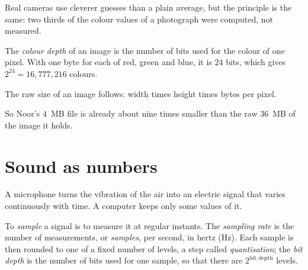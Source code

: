 \label{lst:g10:images-sound-compression:demosaic}

\label{out:g10:images-sound-compression:demosaic}

Real cameras use cleverer guesses than a plain average, but the principle is the same: two thirds of the colour
values of a photograph were computed, not measured.

\begin{definition}\label{def:g10:images-sound-compression:colour-depth}
The \emph{colour depth} of an image is the number of bits used for the colour of one pixel. With
one byte for each of red, green and blue, it is $24$ bits, which gives $2^{24} = 16{,}777{,}216$ colours.
\end{definition}

The raw size of an image follows: width times height times bytes per pixel.

\label{lst:g10:images-sound-compression:raw-size}

\label{out:g10:images-sound-compression:raw-size}

So Noor's $4$~MB file is already about nine times smaller than the raw $36$~MB of the image it holds.

\section{Sound as numbers}\label{sec:g10:images-sound-compression:sound}

A microphone turns the vibration of the air into an electric signal that varies continuously with time. A computer
keeps only some values of it.

\begin{definition}\label{def:g10:images-sound-compression:sampling-rate}
To \emph{sample} a signal is to measure it at regular instants. The \emph{sampling rate} is the
number of measurements, or \emph{samples}, per second, in hertz (Hz). Each sample is then rounded to one of a fixed
number of levels, a step called \emph{quantisation}; the \emph{bit depth} is the number of bits used
for one sample, so that there are $2^{\text{bit depth}}$ levels.
\end{definition}

